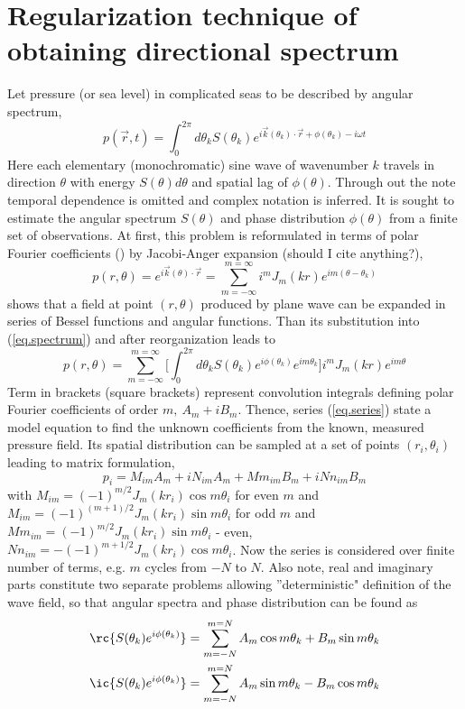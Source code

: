 \section{Regularization technique of obtaining directional spectrum}
Let pressure (or sea level) in complicated seas to be described by angular spectrum,
\begin{equation}
\label{eq.spectrum}
p(\vec{r}, t) = \int_0^{2\pi}  d\theta_k S(\theta_k) e^{i \vec{k}(\theta_k) \cdot \vec{r} + \phi(\theta_k) - i \omega t}
\end{equation}
Here each elementary (monochromatic) sine wave of wavenumber $k$ travels in direction $\theta$ with energy $S(\theta) d\theta$ and spatial lag of $\phi(\theta)$. Through out the note temporal dependence is omitted and complex notation is inferred. It is sought to estimate the angular spectrum $S(\theta)$ and phase distribution $\phi(\theta)$ from a finite set of observations. At first, this problem is reformulated in terms of polar Fourier coefficients (\cite{rafaely2004plane}) by Jacobi-Anger expansion (should I cite anything?),
\begin{equation}
p(r, \theta) = e^{i \vec{k}(\theta) \cdot \vec{r}} = \sum_{m = -\infty}^{m = \infty} i^{m} J_{m}(k r) e^{im(\theta - \theta_k)}
\end{equation}
shows that a field at point $(r, \theta)$ produced by plane wave can be expanded in series of Bessel functions and angular functions. Than its substitution into (\ref{eq.spectrum}) and after reorganization leads to
\begin{equation}
\label{eq.series}
p(r, \theta) = \sum_{m=-\infty}^{m=\infty} \big[ \int_0^{2\pi}  d\theta_k S(\theta_k) e^{i\phi(\theta_k)} e^{im\theta_k} \big] i^m J_m(kr) e^{im\theta}
\end{equation}
Term in brackets (square brackets) represent convolution integrals defining polar Fourier coefficients of order $m,~A_m + i B_m$. Thence, series (\ref{eq.series}) state a model equation to find the unknown coefficients from the known, measured pressure field. Its spatial distribution can be sampled at a set of points $(r_i, \theta_i)$ leading to matrix formulation,
\begin{equation}
p_i = M_{im} A_m + i N_{im} A_m + Mm_{im} B_m + i Nn_{im} B_m
\end{equation}
with $M_{im} = (-1)^{m/2} J_m(k r_i) \cos m\theta_i$ for even $m$ and $M_{im} = (-1)^{(m+1)/2} J_m(k r_i) \sin m\theta_i$ for odd $m$ and
$Mm_{im} = (-1)^{m/2} J_m(k r_i) \sin m\theta_i$ - even, $Nn_{im} = -(-1)^{m+1/2} J_m(k r_i) \cos m\theta_i$. Now the series is considered over finite number of terms, e.g. $m$ cycles from $-N$ to $N$. Also note, real and imaginary parts constitute two separate problems allowing ''deterministic" definition of the wave field, so that angular spectra and phase distribution can be found as
\begin{align}
\rc{S(\theta_k) e^{i \phi(\theta_k)}} = \sum_{m = -N}^{m = N} A_m \cos m\theta_k + B_m \sin m\theta_k\\
\ic{S(\theta_k) e^{i \phi(\theta_k)}} = \sum_{m = -N}^{m = N} A_m \sin m\theta_k - B_m \cos m\theta_k
\end{align}


